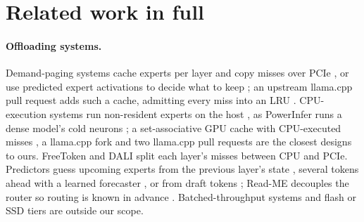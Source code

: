 \section{Related work in full}\label{app:related}
\paragraph{Offloading systems.} Demand-paging systems cache experts per layer and copy misses over
PCIe \citep{eliseev2023offloading,xue2024moeinfinity,song2024promoe,tang2024hobbit,swapmoe2024,adapmoe2024,edgemoe2023,expertflow,pagingexperts2026},
or use predicted expert activations to decide what to keep \citep{sida2024}; an upstream llama.cpp pull request adds
such a cache, admitting every miss into an LRU \citep{llamacpppr29887}. CPU-execution systems run non-resident experts on
the host \citep{kamahori2024fiddler,ktransformers,zhong2025hybrimoe,daop2025,wang2026cloudgrade,atsinfer2026}, as
PowerInfer runs a dense model's cold neurons \citep{powerinfer2024}; a set-associative GPU cache with CPU-executed misses
\citep{huang2025cpugpu}, a llama.cpp fork \citep{leloch2026,llamacppdisc24528} and two llama.cpp pull requests
\citep{llamacpppr26563,llamacpppr27861} are the closest designs to ours. FreeToken \citep{freetoken} and DALI
\citep{dali2026} split each layer's misses between CPU and PCIe. Predictors guess upcoming experts from the previous
layer's state \citep{hwang2024pregated,zhu2025preattention}, several tokens ahead with a learned forecaster
\citep{wang2026seqmoe,mira2026}, or from draft tokens \citep{spmoe,moespac2026,cascade2025}; Read-ME decouples the router
so routing is known in advance \citep{readme2024}. Batched-throughput systems
\citep{flexgen2023,cao2024moelightning,yuan2025moelens} and flash or SSD tiers \citep{llminflash2024,ssdllama,edgezero}
are outside our scope.

